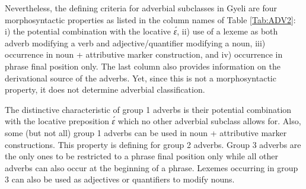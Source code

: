 Nevertheless, the defining criteria for adverbial subclasses in Gyeli are four morphosyntactic properties as listed in the column names of Table \ref{Tab:ADV2}: i) the potential combination with the locative {\itshape ɛ́}, ii) use of a lexeme as both adverb modifying a verb and adjective/quantifier modifying a noun, iii) occurrence in noun + attributive marker construction, and iv) occurrence in phrase final position only. The last column also provides information on the derivational source of the adverbs. Yet, since this is not a morphosyntactic property, it does not determine adverbial classification.


\begin{table} 
\centering
{}
\caption{Criteria for adverb classification}
\label{Tab:ADV2}
\end{table}

The distinctive characteristic of group 1 adverbs is their potential combination with the locative preposition {\itshape ɛ́} which no other adverbial subclass allows for. Also, some (but not all) group 1 adverbs can be used in noun + attributive marker constructions. This property is defining for group 2 adverbs. Group 3 adverbs are the only ones to be restricted to a phrase final position only while all other adverbs can also occur at the beginning of a phrase. Lexemes occurring in group 3 can also be used as adjectives or quantifiers to modify nouns. %

